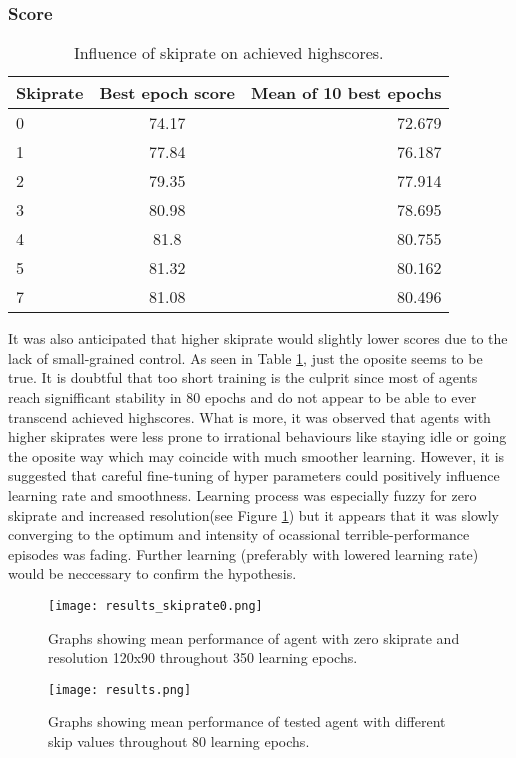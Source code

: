 		\subsubsection{Score}
			\begin{table}
				\begin{center}
					\begin{tabular}{ |l || c | r |}
						\hline
						Skiprate & Best epoch score & Mean of 10 best epochs \\ \hline
						0 & 74.17 & 72.679 \\ \hline
						1 & 77.84 & 76.187 \\ \hline
						2 & 79.35 & 77.914 \\ \hline
						3 & 80.98 & 78.695 \\ \hline
						4 & 81.8 & 80.755 \\ \hline
						5 & 81.32 & 80.162 \\ \hline
						7 & 81.08 & 80.496 \\ \hline
					\end{tabular}
				\end{center}
				\caption{Influence of skiprate on achieved highscores.}\label{tab:results}
			\end{table}
			It was also anticipated that higher skiprate would slightly lower scores due to the lack of small-grained control. As seen in Table \ref{tab:results}, just the oposite seems to be true. It is doubtful that too short training is the culprit since most of agents reach signifficant stability in 80 epochs and do not appear to be able to ever transcend achieved highscores. What is more, it was observed that agents with higher skiprates were less prone to irrational behaviours like staying idle or going the oposite way which may coincide with much smoother learning. However, it is suggested that careful fine-tuning of hyper parameters could positively influence learning rate and smoothness. Learning process was especially fuzzy for zero skiprate and increased resolution(see Figure \ref{fig:results_skiprate0}) but it appears that it was slowly converging to the optimum and intensity of ocassional terrible-performance episodes was fading. Further learning (preferably with lowered learning rate) would be neccessary to confirm the hypothesis.
	
	\begin{figure}
		\centering
		\texttt{[image: results\_skiprate0.png]}
		\caption{Graphs showing mean performance of agent with zero skiprate and resolution 120x90 throughout 350 learning epochs.}\label{fig:results_skiprate0}
	\end{figure}

	\begin{figure}
		\centering
		\texttt{[image: results.png]}
		\caption{Graphs showing mean performance of tested agent with different skip values throughout 80 learning epochs.}\label{fig:results}
	\end{figure}